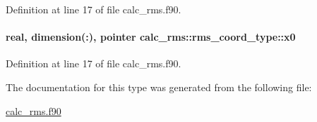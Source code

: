 Definition at line 17 of file calc\-\_\-rms.\-f90.

\hypertarget{structcalc__rms_1_1rms__coord__type_a641692e4616daf83f768d278e1c54b2e}{
\paragraph[{x0}]{\setlength{\rightskip}{0pt plus 5cm}real, dimension(\-:), pointer calc\-\_\-rms\-::rms\-\_\-coord\-\_\-type\-::x0}}\label{structcalc__rms_1_1rms__coord__type_a641692e4616daf83f768d278e1c54b2e}


Definition at line 17 of file calc\-\_\-rms.\-f90.



The documentation for this type was generated from the following file\-:\begin{DoxyCompactItemize}
\item 
\hyperlink{calc__rms_8f90}{calc\-\_\-rms.\-f90}\end{DoxyCompactItemize}
